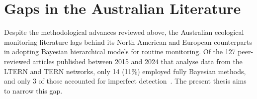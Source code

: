 \section{Gaps in the Australian Literature}

Despite the methodological advances reviewed above, the Australian ecological
monitoring literature lags behind its North American and European counterparts
in adopting Bayesian hierarchical models for routine monitoring. Of the 127
peer-reviewed articles published between 2015 and 2024 that analyse data from
the LTERN and TERN networks, only 14 (11\%) employed fully Bayesian methods,
and only 3 of those accounted for imperfect detection~\cite{bradshaw2012}. The
present thesis aims to narrow this gap.

